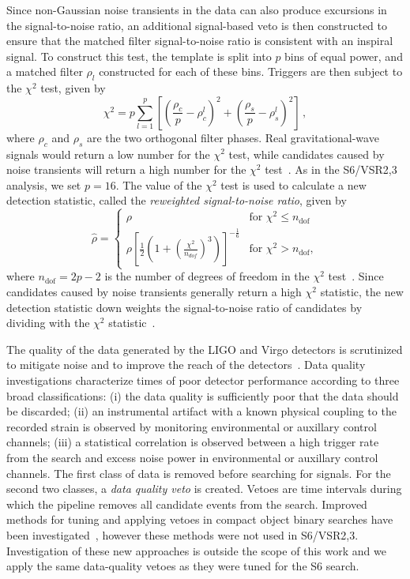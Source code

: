 Since non-Gaussian noise transients in the data can also produce excursions in
the signal-to-noise ratio, an additional signal-based veto is then constructed
to ensure that the matched filter signal-to-noise ratio is
consistent with an inspiral signal. To construct this test, the
template is split into $p$ bins of equal power, and a matched filter $\rho_l$
constructed for each of these bins. Triggers are then subject to the
$\chi^2$ test, given by
%
\begin{equation}
\chi^2 = p\displaystyle\sum_{l=1}^{p}\left[\left(\frac{\rho_c}{p}-\rho_c^l\right)^2 + \left(\frac{\rho_s}{p}-\rho_s^l\right)^2 \right] \, ,
\label{eq:chisqr}
\end{equation}
%
where $\rho_c$ and $\rho_s$ are the two orthogonal filter phases.
Real gravitational-wave signals would return a low number for the $\chi^2$
test, while candidates caused by noise transients will
return a high number for the $\chi^2$ test~\cite{Allen:2004gu}. As in the 
S6/VSR2,3 analysis, we set $p = 16$. The value of the $\chi^2$ test is used to 
calculate a new detection statistic, called the \emph{reweighted
signal-to-noise ratio}, given by 
%
\begin{equation}
\hat{\rho} =
  \begin{cases}
    \rho &\textrm{for } \chi^2 \leq n_\mathrm{dof}\\
    \rho[\frac{1}{2}(1+(\frac{\chi^2}{n_{dof}})^3)]^{-\frac{1}{6}} &\textrm{for } \chi^2 > n_\mathrm{dof} ,
  \end{cases}
\label{eq:newSNR}
\end{equation}
where $n_\mathrm{dof} = 2p-2$ is the number of degrees of freedom in the
$\chi^2$ test~\cite{Babak:2012zx}.
%
Since candidates caused by noise transients generally return a high $\chi^2$
statistic, the new detection statistic down weights the signal-to-noise ratio
of candidates by dividing with the $\chi^2$ statistic~\cite{Abadie:2011nz}.

The quality of the data generated by the LIGO and Virgo detectors is
scrutinized to mitigate noise and to improve the reach of the 
detectors~\cite{Aasi:2012wd,Aasi:2014mqd}. Data
quality investigations characterize times of poor detector performance
according to three broad classifications: (i) the data quality is sufficiently
poor that the data should be discarded; (ii) an instrumental artifact with a
known physical coupling to the recorded strain is observed by monitoring
environmental or auxillary control channels; (iii) a statistical correlation
is observed between a high trigger rate from the search and excess noise power
in environmental or auxillary control channels. The first class of data is
removed before searching for signals. For the second two classes, a \emph{data
quality veto} is created. Vetoes are time intervals during
which the pipeline removes all candidate events from the search.
Improved methods for tuning and applying vetoes in compact object binary
searches have been investigated~\cite{Canton:2013joa}, however these methods
were not used in S6/VSR2,3. Investigation of these new approaches is outside
the scope of this work and we apply the same data-quality vetoes as
they were tuned for the S6 search.

